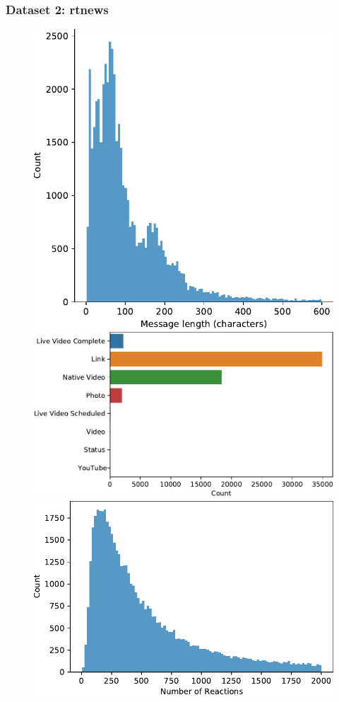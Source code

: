 \documentclass[notes]{tum-presentation}
\begin{document}
\begin{frame}
  \frametitle{Dataset 2: rtnews}

  \begin{figure}[tb] 
    \centering
    \includegraphics[width=.28\textwidth]{../report/figures/dataset_rtnews/message_length_dist.pdf}
    \includegraphics[width=.40\textwidth]{../report/figures/dataset_rtnews/post_types_dist.pdf}
    \includegraphics[width=.30\textwidth]{../report/figures/dataset_rtnews/reactions_dist.pdf}
    
    \label{fig:datasetstats-rtnews}
\end{figure} 
\end{frame}
\end{document}
